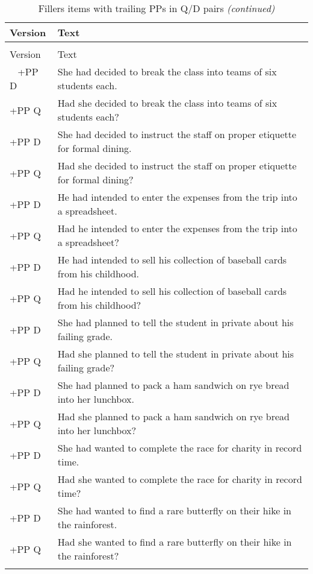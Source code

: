 \documentclass[11pt,oneside]{book}
\begin{document}
\begin{longtable}{ll}
\caption{\label{tab:unnamed-chunk-2}Fillers items with trailing PPs in Q/D pairs}\\
\toprule
Version & Text\\
\midrule
\endfirsthead
\caption[]{\label{tab:unnamed-chunk-2}Fillers items with trailing PPs in Q/D pairs \textit{(continued)}}\\
\toprule
Version & Text\\
\midrule
\endhead
\
\endfoot
\bottomrule
\endlastfoot
+PP D & She had decided to break the class into teams of six students each.\\
+PP Q & Had she decided to break the class into teams of six students each?\\
\addlinespace
+PP D & She had decided to instruct the staff on proper etiquette for formal dining.\\
+PP Q & Had she decided to instruct the staff on proper etiquette for formal dining?\\
\addlinespace
+PP D & He had intended to enter the expenses from the trip into a spreadsheet.\\
+PP Q & Had he intended to enter the expenses from the trip into a spreadsheet?\\
\addlinespace
+PP D & He had intended to sell his collection of baseball cards from his childhood.\\
+PP Q & Had he intended to sell his collection of baseball cards from his childhood?\\
\addlinespace
+PP D & She had planned to tell the student in private about his failing grade.\\
+PP Q & Had she planned to tell the student in private about his failing grade?\\
\addlinespace
+PP D & She had planned to pack a ham sandwich on rye bread into her lunchbox.\\
+PP Q & Had she planned to pack a ham sandwich on rye bread into her lunchbox?\\
\addlinespace
+PP D & She had wanted to complete the race for charity in record time.\\
+PP Q & Had she wanted to complete the race for charity in record time?\\
\addlinespace
+PP D & She had wanted to find a rare butterfly on their hike in the rainforest.\\
+PP Q & Had she wanted to find a rare butterfly on their hike in the rainforest?\\
\addlinespace

\end{longtable}
\end{document}
